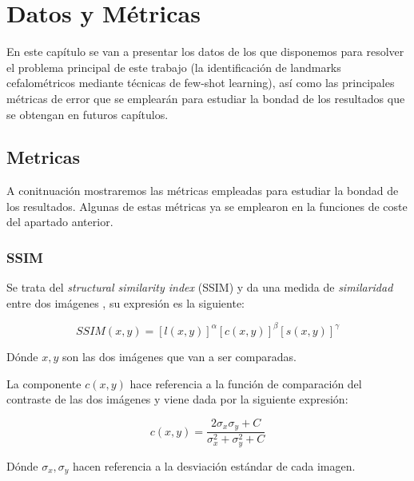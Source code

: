 \chapter{Datos y Métricas}

    \noindent En este capítulo se van a presentar los datos de los que disponemos para resolver el problema principal de este trabajo (la identificación de landmarks cefalométricos mediante técnicas de few-shot learning), así como las principales métricas de error que se emplearán para estudiar la bondad de los resultados que se obtengan en futuros capítulos.

    \section{Metricas}
        
        \noindent A conitnuación mostraremos las métricas empleadas para estudiar la bondad de los resultados. Algunas de estas métricas ya se emplearon en la funciones de coste del apartado anterior. 

        \subsection{SSIM}
            \noindent Se trata del \textit{structural similarity index} (SSIM) y da una medida de \textit{similaridad} entre dos imágenes \cite{wang2004image}, su expresión es la siguiente: 

            \begin{equation}
                SSIM(x,y)=[l(x,y)]^\alpha[c(x,y)]^{\beta}[s(x,y)]^{\gamma}
            \end{equation}

            \medskip

            \noindent Dónde $x,y$ son las dos imágenes que van a ser comparadas.

            \medskip

            \noindent La componente $c(x,y)$ hace referencia a la función de comparación del contraste de las dos imágenes y viene dada por la siguiente expresión: 

            \begin{equation}
                c(x,y)=\frac{2\sigma_x \sigma_y + C}{\sigma_x^2+ \sigma_y^2+C}
            \end{equation}

            \noindent Dónde $\sigma_x, \sigma_y$ hacen referencia a la desviación estándar de cada imagen.

